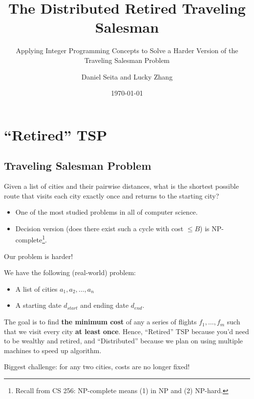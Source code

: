 \documentclass[10pt, xcolor=svgnames]{beamer}
\title[Distributed TSP]{The Distributed Retired Traveling Salesman}
\subtitle{Applying Integer Programming Concepts to Solve a Harder Version of the Traveling Salesman Problem}
\author[Seita and Zhang]{Daniel Seita and Lucky Zhang}
\institute[Williams College]{Department of Computer Science, Williams College}
\date{\today}
\begin{document}
\begin{frame}
	\titlepage
\end{frame}



\section{``Retired'' TSP}

\subsection{Traveling Salesman Problem}

\begin{frame}
\begin{Problem}
Given a list of cities and their pairwise distances, what is the shortest possible route that visits each city exactly once and returns to the
starting city?
\end{Problem}

\begin{itemize}
    \item One of the most studied problems in all of computer science.
    \item Decision version (does there exist such a cycle with cost $\le B$) is NP-complete\footnote{Recall from CS 256: NP-complete means (1) in NP
and (2) NP-hard.}.
\end{itemize}
\end{frame}

\begin{frame}
Our problem is harder!
\begin{Problem}
We have the following (real-world) problem:
\begin{itemize}
    \item A list of cities $a_1, a_2, \ldots, a_n$
    \item A starting date $d_{start}$ and ending date $d_{end}$.
\end{itemize}
The goal is to find \textbf{the minimum cost} of any a series of flights $f_1, \ldots, f_m$ such that we visit every city \textbf{at least once}.
Hence, ``Retired'' TSP because you'd need to be wealthy and retired, and ``Distributed'' because we plan on using multiple machines to speed up
algorithm. 
\end{Problem}
\pause
Biggest challenge: for any two cities, costs are no longer fixed! 
\end{frame}
\end{document}
